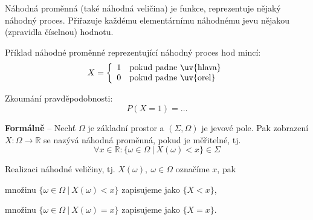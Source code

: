 \begin{compactitem}
    \item Náhodná proměnná (také náhodná veličina) je funkce, reprezentuje nějaký náhodný proces. Přiřazuje každému elementárnímu náhodnému jevu nějakou (zpravidla číselnou) hodnotu. \begin{compactitem}


        \item Příklad náhodné proměnné reprezentující náhodný proces hod mincí:
        $$ X = \left\{
            \begin{array}{ll}
                1 & \text{pokud padne \uv{hlava}} \\
                0 & \text{pokud padne \uv{orel}}
            \end{array}
            \right.$$

        Zkoumání pravděpodobnosti:
        $$ P(X = 1) = \ldots$$

    \end{compactitem}

    \item \textbf{Formálně} -- Nechť $\Omega$ je základní prostor a $(\Sigma, \Omega)$ je jevové pole. Pak zobrazení $X : \Omega \rightarrow \mathbb{R}$ se nazývá náhodná proměnná, pokud je měřitelné, tj.
    $$\forall x \in \mathbb{R} : \{ \omega \in \Omega ~|~ X(\omega) < x \} \in \Sigma$$

    \item Realizaci náhodné veličiny, tj. $X(\omega),~ \omega \in \Omega$ označíme $x$, pak \begin{compactitem}
        \item množinu $\{ \omega \in \Omega ~|~ X(\omega) < x \}$ zapisujeme jako $\{ X < x \}$,

        \item množinu $\{ \omega \in \Omega ~|~ X(\omega) = x \}$ zapisujeme jako $\{ X = x \}$.
    \end{compactitem}


\end{compactitem}

